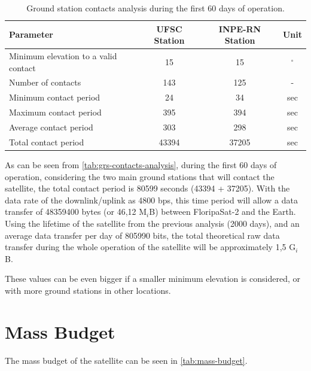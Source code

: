 \begin{table}[!h]
    \centering
    \begin{tabular}{lccc}
        \toprule[1.5pt]
        \textbf{Parameter} & \textbf{UFSC Station} & \textbf{INPE-RN Station} & \textbf{Unit} \\
        \midrule
        Minimum elevation to a valid contact    & 15    & 15    & $^{\circ}$ \\
        Number of contacts                      & 143   & 125   & - \\
        Minimum contact period                  & 24    & 34    & sec \\
        Maximum contact period                  & 395   & 394   & sec \\
        Average contact period                  & 303   & 298   & sec \\
        Total contact period                    & 43394 & 37205 & sec \\
        \bottomrule[1.5pt]
    \end{tabular}
    \caption{Ground station contacts analysis during the first 60 days of operation.}
    \label{tab:grs-contacts-analysis}
\end{table}

As can be seen from \autoref{tab:grs-contacts-analysis}, during the first 60 days of operation, considering the two main ground stations that will contact the satellite, the total contact period is 80599 seconds (43394 + 37205). With the data rate of the downlink/uplink as 4800 bps, this time period will allow a data transfer of 48359400 bytes (or 46,12 M$_{i}$B) between FloripaSat-2 and the Earth. Using the lifetime of the satellite from the previous analysis (2000 days), and an average data transfer per day of 805990 bits, the total theoretical raw data transfer during the whole operation of the satellite will be approximately 1,5 G$_{i}$B.

These values can be even bigger if a smaller minimum elevation is considered, or with more ground stations in other locations.

\section{Mass Budget} \label{mass-budget}

The mass budget of the satellite can be seen in \autoref{tab:mass-budget}.

